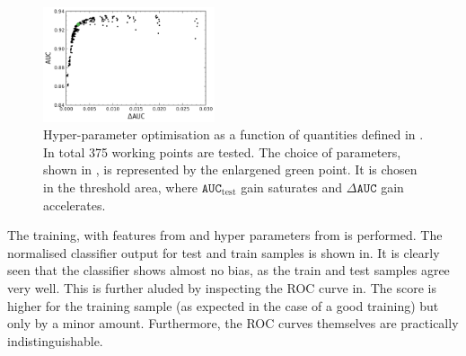\begin{figure}[htbp!]
    \centering
    \includegraphics[width=0.45\textwidth]{figures/continuum_suppression/hyperpar_optimisation.png}
    \caption{\label{fig:hyper_param}Hyper-parameter optimisation as a function of quantities defined in .
    In total 375 working points are tested.
    The choice of parameters, shown in , is represented by the enlargened green point.
    It is chosen in the threshold area, where $\mathtt{AUC}_{\mathrm{test}}$ gain saturates and $\Delta \mathtt{AUC}$ gain accelerates.
    }
\end{figure}

The training, with features from  and hyper parameters from  is performed.
The normalised classifier output for test and train samples is shown in.
It is clearly seen that the classifier shows almost no bias, as the train and test samples agree very well.
This is further aluded by inspecting the ROC curve in.
The \AUC score is higher for the training sample (as expected in the case of a good training) but only by a minor amount.
Furthermore, the ROC curves themselves are practically indistinguishable.

